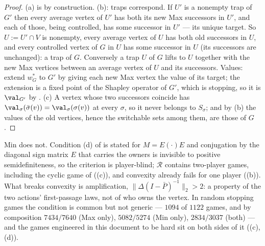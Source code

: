 \begin{proof}
(a) is by construction. (b): traps correspond. If $U'$ is a nonempty trap of
$G'$ then every average vertex of $U'$ has both its new Max successors in
$U'$, and each of those, being controlled, has some successor in $U'$ ---
its unique target. So $U:=U'\cap V$ is nonempty, every average vertex of $U$
has both old successors in $U$, and every controlled vertex of $G$ in $U$
has some successor in $U$ (its successors are unchanged): a trap of $G$.
Conversely a trap $U$ of $G$ lifts to $U$ together with the new Max vertices
between an average vertex of $U$ and its successors. Values: extend
$w^{\ast}_G$ to $G'$ by giving each new Max vertex the value of its target;
the extension is a fixed point of the Shapley operator of $G'$, which is
stopping, so it is $\val_{G'}$ by . (c) A vertex whose
two successors coincide has $\val_\sigma(\bar\sigma(v))=\val_\sigma(\sigma(v))$
at every $\sigma$, so it never belongs to $S_\sigma$; and by (b) the values
of the old vertices, hence the switchable sets among them, are those of $G$.
\end{proof}

\begin{remark}\label{vr:min}
Min does not. Condition (d) of  is stated for
$M=E(\cdot)E$ and conjugation by the diagonal sign matrix $E$ that carries
the owners is invisible to positive semidefiniteness, so the criterion is
player-blind; $\mathcal R$ contains two-player games, including the cyclic
game of  ((c)), and convexity already
fails for one player ((b)). What breaks convexity is
amplification, $\|\Delta(I-\bar P)^{-1}\|_2>2$: a property of the two
actions' first-passage laws, not of who owns the vertex. In random stopping
games the condition is common but not generic --- $1094$ of $1122$ games,
and by composition $7434/7640$ (Max only), $5082/5274$ (Min only),
$2834/3037$ (both) --- and the games engineered in this document to be hard
sit on both sides of it ((c),(d)).
\end{remark}